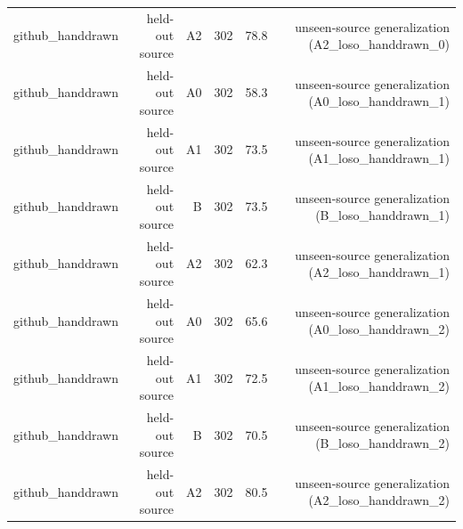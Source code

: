 \begin{tabular}{lrrrrr}
github\_handdrawn & held-out source & A2 & 302 & 78.8 & unseen-source generalization (A2\_loso\_handdrawn\_0) \\
github\_handdrawn & held-out source & A0 & 302 & 58.3 & unseen-source generalization (A0\_loso\_handdrawn\_1) \\
github\_handdrawn & held-out source & A1 & 302 & 73.5 & unseen-source generalization (A1\_loso\_handdrawn\_1) \\
github\_handdrawn & held-out source & B & 302 & 73.5 & unseen-source generalization (B\_loso\_handdrawn\_1) \\
github\_handdrawn & held-out source & A2 & 302 & 62.3 & unseen-source generalization (A2\_loso\_handdrawn\_1) \\
github\_handdrawn & held-out source & A0 & 302 & 65.6 & unseen-source generalization (A0\_loso\_handdrawn\_2) \\
github\_handdrawn & held-out source & A1 & 302 & 72.5 & unseen-source generalization (A1\_loso\_handdrawn\_2) \\
github\_handdrawn & held-out source & B & 302 & 70.5 & unseen-source generalization (B\_loso\_handdrawn\_2) \\
github\_handdrawn & held-out source & A2 & 302 & 80.5 & unseen-source generalization (A2\_loso\_handdrawn\_2) \\
\bottomrule
\end{tabular}
